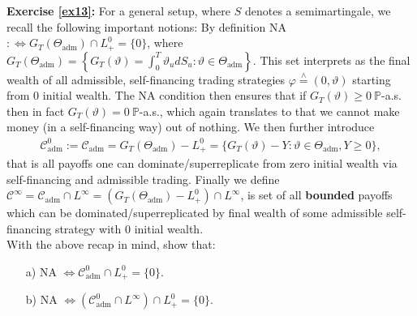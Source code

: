 \documentclass[12pt,a4paper, twoside]{article}
\theoremstyle{definition}
\newcommand{\PP}{\mathbb{P}} %
\newcommand{\teq}{\overset{\wedge}{=}}
\begin{document}
\newpage
\noindent \textbf{Exercise \ref{ex13}:} For a general setup, where $S$ denotes a semimartingale, we recall the following important notions: By definition NA $: \iff G_T( \Theta_\text{adm}) \cap L_+^0 = \{0\}$, where 
$
G_T( \Theta_\text{adm}) = \left\{ G_T( \vartheta) = \int_0^T \vartheta_u dS_u : \vartheta  \in \Theta_\text{adm} \right\}.
$
This set interprets as the final wealth of all admissible, self-financing trading strategies $\varphi \teq(0, \vartheta)$ starting from $0$ initial wealth. The NA condition then ensures that if $G_T( \vartheta) \geq 0 \ \PP$-a.s. then in fact $G_T( \vartheta)=0 \ \PP$-a.s., which again translates to that we cannot make money (in a self-financing way) out of nothing. We then further introduce
\begin{align*}
\mathcal{C}_\text{adm}^0 := \mathcal{C}_\text{adm} = G_T( \Theta_\text{adm})-L_+^0 = \{ G_T( \vartheta)-Y : \vartheta \in \Theta_\text{adm}, Y \geq 0\},
\end{align*}
that is all payoffs one can dominate/superreplicate from zero initial wealth via self-financing and admissible trading. Finally we define $\mathcal{C}^\infty = \mathcal{C}_\text{adm} \cap L^\infty = ( G_T( \Theta_\text{adm})-L_+^0) \cap L^\infty$, is set of all \textbf{bounded} payoffs which can be dominated/superreplicated by final wealth of some admissible self-financing strategy with $0$ initial wealth. \\
With the above recap in mind, show that:
\begin{itemize}
\item[a)] NA $\iff \mathcal{C}_\text{adm}^0 \cap L_+^0= \{0\}$.
\item[b)] NA $\iff ( \mathcal{C}_\text{adm}^0 \cap L^\infty) \cap L_+^0 = \{0\}.$
\end{itemize}
\end{document}

